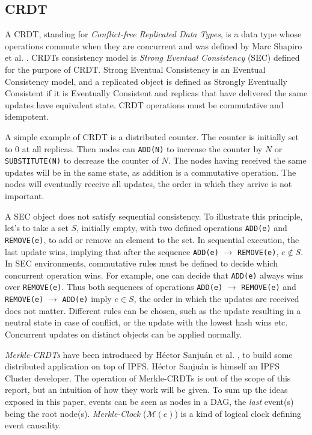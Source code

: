 \documentclass[a4paper,11pt,oneside]{report}
\begin{document}
\subsection{CRDT}

A CRDT, standing for \textit{Conflict-free Replicated Data Types}, is a data type whose operations commute when they are concurrent and was defined by Marc Shapiro et al. \cite{crdt}. CRDTs consistency model is \textit{Strong Eventual Consistency} (SEC) defined for the purpose of CRDT. Strong Eventual Consistency is an Eventual Consistency model, and a replicated object is defined as Strongly Eventually Consistent if it is Eventually Consistent and replicas that have delivered the same updates have equivalent state. CRDT operations must be commutative and idempotent. 

A simple example of CRDT is a distributed counter. The counter is initially set to $0$ at all replicas. Then nodes can \texttt{ADD(N)} to increase the counter by $N$ or \texttt{SUBSTITUTE(N)} to decrease the counter of $N$. The nodes having received the same updates will be in the same state, as addition is a commutative operation. The nodes will eventually receive all updates, the order in which they arrive is not important.

A SEC object does not satisfy sequential consistency. To illustrate this principle, let's to take a set $S$, initially empty, with two defined operations \texttt{ADD(e)} and \texttt{REMOVE(e)}, to add or remove an element to the set. In sequential execution, the last update wins, implying that after the sequence \texttt{ADD(e)} $\rightarrow$ \texttt{REMOVE(e)}, $e \notin S$. In SEC environments, commutative rules must be defined to decide which concurrent operation wins. For example, one can decide that \texttt{ADD(e)} always wins over \texttt{REMOVE(e)}. Thus both sequences of operations \texttt{ADD(e)} $\rightarrow$ \texttt{REMOVE(e)} and \texttt{REMOVE(e)} $\rightarrow$ \texttt{ADD(e)} imply $e \in S$, the order in which the updates are received does not matter. Different rules can be chosen, such as the update resulting in a neutral state in case of conflict, or the update with the lowest hash wins etc. Concurrent updates on distinct objects can be applied normally. 

\textit{Merkle-CRDTs} have been introduced by Héctor Sanjuán et al. \cite{merkle-crdts}, to build some distributed application on top of IPFS. Héctor Sanjuán is himself an IPFS Cluster developer. The operation of Merkle-CRDTs is out of the scope of this report, but an intuition of how they work will be given. To sum up the ideas exposed in this paper, events can be seen as nodes in a DAG, the \textit{last} event(s) being the root node(s). \textit{Merkle-Clock} ($\mathcal{M}(e)$) is a kind of logical clock defining event causality. 
\end{document}
